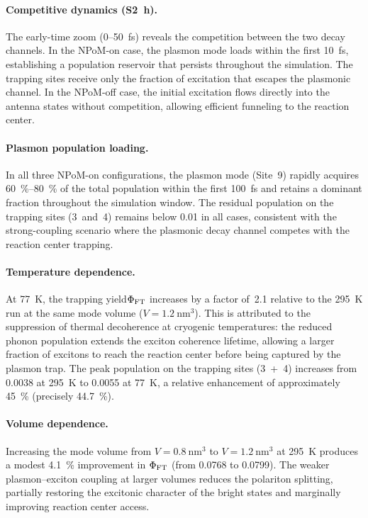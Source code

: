 \documentclass[11pt,a4paper]{article}
\begin{document}
\paragraph{Competitive dynamics (S\qty{2}{\hour}).}
The early-time zoom (0--\qty{50}{\fs}) reveals the competition between the two
decay channels. In the NPoM-on case, the plasmon mode loads within
the first \qty{10}{\fs}, establishing a population reservoir that
persists throughout the simulation. The trapping sites receive only the
fraction of excitation that escapes the plasmonic channel. In the NPoM-off
case, the initial excitation flows directly into the antenna states without
competition, allowing efficient funneling to the reaction center.

\paragraph{Plasmon population loading.}
In all three NPoM-on configurations, the plasmon mode (Site~9) rapidly acquires
\qty{60}{\percent}--\qty{80}{\percent} of the total population within the first
\qty{100}{\fs} and retains a dominant fraction throughout the simulation window.
The residual population on the trapping sites (3~and~4) remains below
\num{0.01} in all cases, consistent with the strong-coupling scenario where
the plasmonic decay channel competes with the reaction center trapping.

\paragraph{Temperature dependence.} \label{SI-sec:cryo}
At \qty{77}{\kelvin}, the trapping yield$\Phi_{\rm FT}$ increases by a factor of~2.1 relative to the \qty{295}{\kelvin} run at the same mode volume
($V = \qty{1.2}{\nm\cubed}$). This is attributed to the suppression of thermal
decoherence at cryogenic temperatures: the reduced phonon population extends
the exciton coherence lifetime, allowing a larger fraction of excitons to reach
the reaction center before being captured by the plasmon trap.
The peak population on the trapping sites (3~+~4) increases from \num{0.0038}
at \qty{295}{\kelvin} to \num{0.0055} at \qty{77}{\kelvin}, a relative enhancement
of approximately \qty{45}{\percent} (precisely \qty{44.7}{\percent}).

\paragraph{Volume dependence.}
Increasing the mode volume from $V = \qty{0.8}{\nm\cubed}$ to
$V = \qty{1.2}{\nm\cubed}$ at \qty{295}{\kelvin} produces a modest
\qty{4.1}{\percent} improvement in $\Phi_{\rm FT}$ (from \num{0.0768} to
\num{0.0799}). The weaker plasmon--exciton coupling at larger volumes reduces
the polariton splitting, partially restoring the excitonic character of the
bright states and marginally improving reaction center access.
\end{document}
